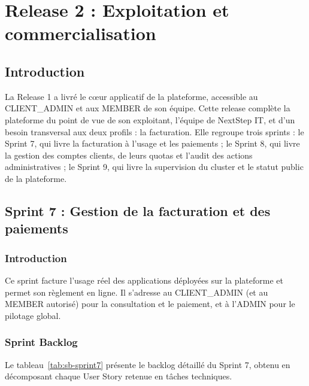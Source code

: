 \chapter{Release 2 : Exploitation et commercialisation}

\section{Introduction}

La Release 1 a livré le cœur applicatif de la plateforme, accessible au CLIENT\_ADMIN et aux MEMBER de son équipe. Cette release complète la plateforme du point de vue de son exploitant, l'équipe de NextStep IT, et d'un besoin transversal aux deux profils : la facturation. Elle regroupe trois sprints : le Sprint 7, qui livre la facturation à l'usage et les paiements ; le Sprint 8, qui livre la gestion des comptes clients, de leurs quotas et l'audit des actions administratives ; le Sprint 9, qui livre la supervision du cluster et le statut public de la plateforme.

\section{Sprint 7 : Gestion de la facturation et des paiements}

\subsection{Introduction}

Ce sprint facture l'usage réel des applications déployées sur la plateforme et permet son règlement en ligne. Il s'adresse au CLIENT\_ADMIN (et au MEMBER autorisé) pour la consultation et le paiement, et à l'ADMIN pour le pilotage global.

\subsection{Sprint Backlog}
Le tableau~\ref{tab:sb-sprint7} présente le backlog détaillé du Sprint 7, obtenu en décomposant chaque User Story retenue en tâches techniques.

